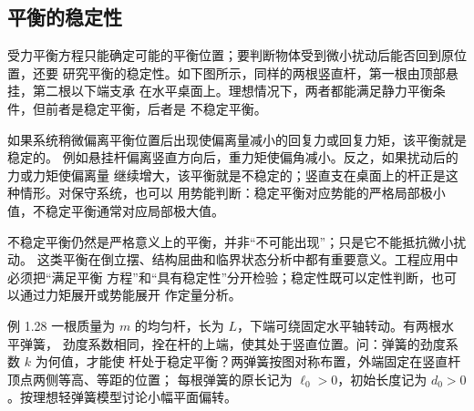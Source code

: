 \subsection{平衡的稳定性}

受力平衡方程只能确定可能的平衡位置；要判断物体受到微小扰动后能否回到原位置，还要
研究平衡的稳定性。如下图所示，同样的两根竖直杆，第一根由顶部悬挂，第二根以下端支承
在水平桌面上。理想情况下，两者都能满足静力平衡条件，但前者是稳定平衡，后者是
不稳定平衡。


如果系统稍微偏离平衡位置后出现使偏离量减小的回复力或回复力矩，该平衡就是稳定的。
例如悬挂杆偏离竖直方向后，重力矩使偏角减小。反之，如果扰动后的力或力矩使偏离量
继续增大，该平衡就是不稳定的；竖直支在桌面上的杆正是这种情形。对保守系统，也可以
用势能判断：稳定平衡对应势能的严格局部极小值，不稳定平衡通常对应局部极大值。

不稳定平衡仍然是严格意义上的平衡，并非“不可能出现”；只是它不能抵抗微小扰动。
这类平衡在倒立摆、结构屈曲和临界状态分析中都有重要意义。工程应用中必须把“满足平衡
方程”和“具有稳定性”分开检验；稳定性既可以定性判断，也可以通过力矩展开或势能展开
作定量分析。

\begin{origexamplebox}{例 1.28}
一根质量为 $m$ 的均匀杆，长为 $L$，下端可绕固定水平轴转动。有两根水平弹簧，
劲度系数相同，拴在杆的上端，使其处于竖直位置。问：弹簧的劲度系数 $k$ 为何值，才能使
杆处于稳定平衡？两弹簧按图对称布置，外端固定在竖直杆顶点两侧等高、等距的位置；
每根弹簧的原长记为 $\ell_0>0$，初始长度记为 $d_0>0$。按理想轻弹簧模型讨论小幅平面偏转。
\end{origexamplebox}

